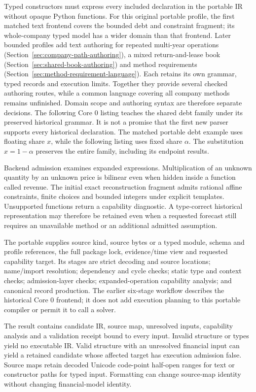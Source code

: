 Typed constructors must express every included declaration in the portable IR
without opaque Python functions. For this original portable profile, the first
matched text frontend covers the bounded debt and constraint fragment; its
whole-company typed model has a wider domain than that frontend. Later bounded
profiles add text authoring for repeated multi-year operations
(Section~\ref{sec:company-path-authoring}), a mixed return-and-lease book
(Section~\ref{sec:shared-book-authoring}) and method requirements
(Section~\ref{sec:method-requirement-language}). Each retains its own grammar,
typed records and execution limits. Together they provide several checked
authoring routes, while a common language covering all company methods remains
unfinished. Domain scope and authoring syntax are therefore separate decisions.
The following Core 0 listing teaches the shared debt family under its preserved
historical grammar. It is not a promise that the first new parser supports every
historical declaration.
The matched portable debt example uses floating share $x$, while the following
listing uses fixed share $\alpha$. The substitution $x=1-\alpha$ preserves
the entire family, including its endpoint results.

Backend admission examines expanded expressions. Multiplication of an unknown
quantity by an unknown price is bilinear even when hidden inside a function
called revenue. The initial exact reconstruction fragment admits rational affine
constraints, finite choices and bounded integers under explicit templates.
Unsupported functions return a capability diagnostic. A type-correct historical
representation may therefore be retained even when a requested forecast still
requires an unavailable method or an additional admitted assumption.

The portable  supplies source kind, source bytes or a typed
module, schema and profile references, the full package lock, evidence/time view
and requested capability target. Its stages are strict decoding and source
locations; name/import resolution; dependency and cycle checks; static type and
context checks; admission-layer checks; expanded-operation capability analysis;
and canonical record production. The earlier six-stage workflow describes the
historical Core 0 frontend; it does not add execution planning to this portable
compiler or permit it to call a solver.

The result contains candidate IR, source map, unresolved inputs, capability
analysis and a validation receipt bound to every input. Invalid structure or
types yield no executable IR. Valid structure with an unresolved financial input
can yield a retained candidate whose affected target has execution admission
false. Source maps retain decoded Unicode code-point half-open ranges for text
or constructor paths for typed input. Formatting can change source-map identity
without changing financial-model identity.

